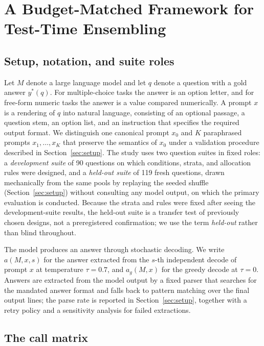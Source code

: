 \section{A Budget-Matched Framework for Test-Time Ensembling}
\label{sec:method}

\subsection{Setup, notation, and suite roles}

Let $M$ denote a large language model and let $q$ denote a question with a gold answer $y^*(q)$. For multiple-choice tasks the answer is an option letter, and for free-form numeric tasks the answer is a value compared numerically. A prompt $x$ is a rendering of $q$ into natural language, consisting of an optional passage, a question stem, an option list, and an instruction that specifies the required output format. We distinguish one canonical prompt $x_0$ and $K$ paraphrased prompts $x_1, \dots, x_K$ that preserve the semantics of $x_0$ under a validation procedure described in Section~\ref{sec:setup}. The study uses two question suites in fixed roles: a \emph{development suite} of 90 questions on which conditions, strata, and allocation rules were designed, and a \emph{held-out suite} of 119 fresh questions, drawn mechanically from the same pools by replaying the seeded shuffle (Section~\ref{sec:setup}) without consulting any model output, on which the primary evaluation is conducted. Because the strata and rules were fixed after seeing the development-suite results, the held-out suite is a transfer test of previously chosen designs, not a preregistered confirmation; we use the term \emph{held-out} rather than blind throughout.

The model produces an answer through stochastic decoding. We write $a(M, x, s)$ for the answer extracted from the $s$-th independent decode of prompt $x$ at temperature $\tau = 0.7$, and $a_g(M, x)$ for the greedy decode at $\tau = 0$. Answers are extracted from the model output by a fixed parser that searches for the mandated answer format and falls back to pattern matching over the final output lines; the parse rate is reported in Section~\ref{sec:setup}, together with a retry policy and a sensitivity analysis for failed extractions.

\subsection{The call matrix}

